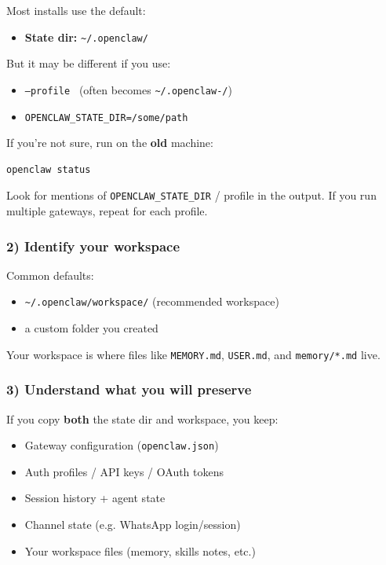 Most installs use the default:

\begin{itemize}
  \item \textbf{State dir:} \texttt{\textasciitilde{}/.openclaw/}
\end{itemize}


But it may be different if you use:

\begin{itemize}
  \item \texttt{--profile } (often becomes \texttt{\textasciitilde{}/.openclaw-/})
  \item \texttt{OPENCLAW\_STATE\_DIR=/some/path}
\end{itemize}


If you’re not sure, run on the \textbf{old} machine:

\begin{lstlisting}[language=bash]
openclaw status
\end{lstlisting}


Look for mentions of \texttt{OPENCLAW\_STATE\_DIR} / profile in the output. If you run multiple gateways, repeat for each profile.

\subsubsection{2) Identify your workspace}


Common defaults:

\begin{itemize}
  \item \texttt{\textasciitilde{}/.openclaw/workspace/} (recommended workspace)
  \item a custom folder you created
\end{itemize}


Your workspace is where files like \texttt{MEMORY.md}, \texttt{USER.md}, and \texttt{memory/*.md} live.

\subsubsection{3) Understand what you will preserve}


If you copy \textbf{both} the state dir and workspace, you keep:

\begin{itemize}
  \item Gateway configuration (\texttt{openclaw.json})
  \item Auth profiles / API keys / OAuth tokens
  \item Session history + agent state
  \item Channel state (e.g. WhatsApp login/session)
  \item Your workspace files (memory, skills notes, etc.)
\end{itemize}


